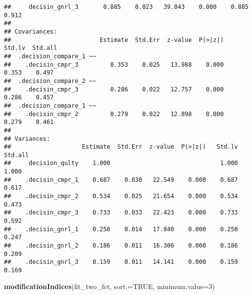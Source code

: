 \documentclass[]{article}
\newenvironment{Shaded}{\begin{snugshade}}{\end{snugshade}}
\newcommand{\DataTypeTok}[1]{\textcolor[rgb]{0.13,0.29,0.53}{#1}}
\newcommand{\DecValTok}[1]{\textcolor[rgb]{0.00,0.00,0.81}{#1}}
\newcommand{\KeywordTok}[1]{\textcolor[rgb]{0.13,0.29,0.53}{\textbf{#1}}}
\newcommand{\NormalTok}[1]{#1}
\newcommand{\OtherTok}[1]{\textcolor[rgb]{0.56,0.35,0.01}{#1}}
\begin{document}
\begin{verbatim}
##     decisin_gnrl_3       0.885    0.023   39.043    0.000    0.885    0.912
## 
## Covariances:
##                         Estimate  Std.Err  z-value  P(>|z|)   Std.lv  Std.all
##  .decision_compare_1 ~~                                                      
##    .decisin_cmpr_3         0.353    0.025   13.988    0.000    0.353    0.497
##  .decision_compare_2 ~~                                                      
##    .decisin_cmpr_3         0.286    0.022   12.757    0.000    0.286    0.457
##  .decision_compare_1 ~~                                                      
##    .decisin_cmpr_2         0.279    0.022   12.898    0.000    0.279    0.461
## 
## Variances:
##                    Estimate  Std.Err  z-value  P(>|z|)   Std.lv  Std.all
##     decision_qulty    1.000                               1.000    1.000
##    .decisin_cmpr_1    0.687    0.030   22.549    0.000    0.687    0.617
##    .decisin_cmpr_2    0.534    0.025   21.654    0.000    0.534    0.473
##    .decisin_cmpr_3    0.733    0.033   22.423    0.000    0.733    0.592
##    .decisin_gnrl_1    0.250    0.014   17.840    0.000    0.250    0.247
##    .decisin_gnrl_2    0.186    0.011   16.306    0.000    0.186    0.209
##    .decisin_gnrl_3    0.159    0.011   14.141    0.000    0.159    0.169
\end{verbatim}

\begin{Shaded}
\begin{Highlighting}[]
\KeywordTok{modificationIndices}\NormalTok{(fit_two_fct, }\DataTypeTok{sort.=}\OtherTok{TRUE}\NormalTok{, }\DataTypeTok{minimum.value=}\DecValTok{3}\NormalTok{)}
\end{Highlighting}
\end{Shaded}
\end{document}

